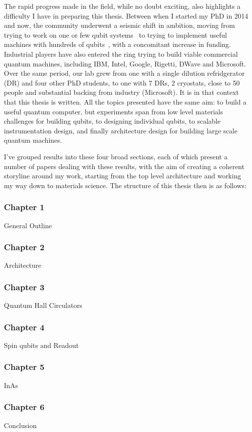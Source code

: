 The rapid progress made in the field, while no doubt exciting, also highlights a difficulty I have in
preparing this thesis. Between when I started my PhD in 2014 and now, the community underwent a seismic
shift in ambition, moving from trying to work on one or few qubit systems~\cite{iarpa_mqco} to trying 
to implement useful machines with hundreds of qubits~\cite{Monroe440}, with a concomitant increase in
funding. Industrial players have also
entered the ring trying to build viable commercial quantum machines, including IBM, Intel, Google, Rigetti, 
DWave and Microsoft. Over the same period, our lab grew from one with a single dilution refridgerator (DR) 
and four other PhD students, to one with 7 DRs, 2 cryostats, close to 50 people and substantial backing
from industry (Microsoft). It is in that context that this thesis is written. All the topics presented have the
same aim: to build a useful quantum computer, but experiments span from low level materials challenges
for building qubits, to designing individual qubits, to scalable instrumentation design, and finally architecture
design for building large scale quantum machines. 

I've grouped results into these four broad sections, each of which present a number of papers dealing 
with these results, with the aim of creating a coherent storyline around my work, starting from the top
level architecture and working my way down to materials science. The structure of this
thesis then is as follows:

\subsubsection{Chapter 1}
General Outline

\subsubsection{Chapter 2}
Architecture

\subsubsection{Chapter 3}
Quantum Hall Circulators

\subsubsection{Chapter 4}
Spin qubits and Readout

\subsubsection{Chapter 5}
InAs

\subsubsection{Chapter 6}
Conclusion

